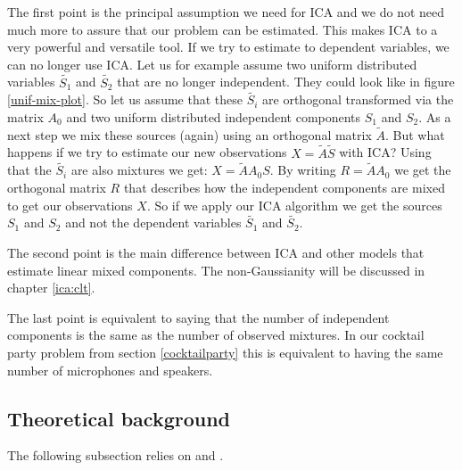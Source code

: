 \documentclass[12pt, a4paper]{article}
\numberwithin{equation}{section}
\numberwithin{figure}{section}
\numberwithin{table}{section}
\begin{document}
	
	The first point is the principal assumption we need for ICA and we do not need much more to assure that our problem can be estimated.
	This makes ICA to a very powerful and versatile tool.
	If we try to estimate to dependent variables, we can no longer use ICA.
	Let us for example assume two uniform distributed variables \mbox{$\tilde{S_1}$} and \mbox{$\tilde{S_2}$} that are no longer independent.
	They could look like in figure \ref{unif-mix-plot}.
	So let us assume that these \mbox{$\tilde{S_i}$} are orthogonal transformed via the matrix \mbox{$A_0$} and two uniform distributed independent components \mbox{$S_1$} and \mbox{$S_2$}.
	As a next step we mix these sources (again) using an orthogonal matrix \mbox{$\tilde{A}$}.
	But what happens if we try to estimate our new observations \mbox{$X=\tilde{A}\tilde{S}$} with ICA?
	Using that the \mbox{$\tilde{S_i}$} are also mixtures we get: \mbox{$X=\tilde{A}A_0S$}.
	By writing \mbox{$R=\tilde{A}A_0$} we get the orthogonal matrix $R$ that describes how the independent components are mixed to get our observations $X$.
	So if we apply our ICA algorithm we get the sources \mbox{$S_1$} and \mbox{$S_2$} and not the dependent variables \mbox{$\tilde{S_1}$} and \mbox{$\tilde{S_2}$}.
	
	The second point is the main difference between ICA and other models that estimate linear mixed components.
	The non-Gaussianity will be discussed in chapter \ref{ica:clt}.
	
	The last point is equivalent to saying that the number of independent components is the same as the number of observed mixtures.
	In our cocktail party problem from section \ref{cocktailparty} this is equivalent to having the same number of microphones and speakers.
	
	\subsection{Theoretical background} \label{ica:basics}
	
	
	The following subsection relies on \citet{elementsofstatisticallearning} and \citet{ICA_Book}.
	
\end{document}
